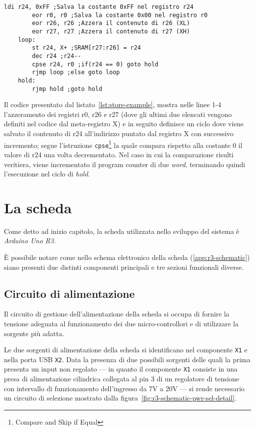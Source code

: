\noindent\begin{minipage}{\textwidth}
    \begin{lstlisting}[language=AVR, caption={Esempio di utilizzo dell'istruzione \texttt{st}}, label=lst:store-example]
        ldi r24, 0xFF ;Salva la costante 0xFF nel registro r24
        eor r0, r0 ;Salva la costante 0x00 nel registro r0
        eor r26, r26 ;Azzera il contenuto di r26 (XL)
        eor r27, r27 ;Azzera il contenuto di r27 (XH)
    loop:
        st r24, X+ ;SRAM[r27:r26] = r24
        dec r24 ;r24--
        cpse r24, r0 ;if(r24 == 0) goto hold
        rjmp loop ;else goto loop
    hold:
        rjmp hold ;goto hold

    \end{lstlisting}
\end{minipage}

Il codice presentato dal listato~\ref{lst:store-example}, mostra nelle linee 1-4 l'azzeramento dei registri r0, r26 e r27 (dove gli ultimi due elencati vengono definiti nel codice dal meta-registro X) e in seguito definisce un ciclo dove viene salvato il contenuto di r24 all'indirizzo puntato dal registro X con successivo incremento; segue l'istruzione \texttt{cpse}\footnote{Compare and Skip if Equal} la quale compara rispetto alla costante 0 il valore di r24 una volta decrementato. Nel caso in cui la comparazione risulti veritiera, viene incrementato il program counter di due \textit{word}, terminando quindi l'esecuzione nel ciclo di \textit{hold}.

\section{La scheda}
Come detto ad inizio capitolo, la scheda utilizzata nello sviluppo del sistema è \textit{Arduino Uno R3}.

È possibile notare come nello schema elettronico della scheda (\ref{app:r3-schematic}) siano presenti due distinti componenti principali e tre sezioni funzionali diverse.

\subsection{Circuito di alimentazione}

Il circuito di gestione dell'alimentazione della scheda si occupa di fornire la tensione adeguata al funzionamento dei due micro-controllori e di utilizzare la sorgente più adatta.

Le due sorgenti di alimentazione della scheda si identificano nel componente \texttt{X1} e nella porta USB \texttt{X2}. Data la presenza di due possibili sorgenti delle quali la prima presenta un input non regolato --- in quanto il componente \texttt{X1} consiste in una presa di alimentazione cilindrica collegata al pin 3 di un regolatore di tensione con intervallo di funzionamento dell'ingresso da 7V a 20V\cite{onsemi:ncp111750} --- si rende necessario un circuito di selezione mostrato dalla figura~\ref{fig:r3-schematic-pwr-sel-detail}.

